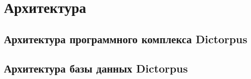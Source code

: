 \chapter{Архитектура} \label{chapt_arch}

\section{Архитектура программного комплекса Dictorpus} \label{sect_arch_soft}

\section{Архитектура базы данных Dictorpus} \label{sect_arch_db}

